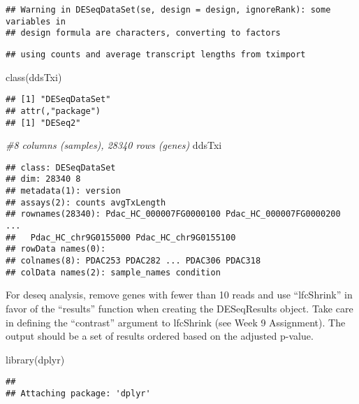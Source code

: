 \documentclass[
]{article}
\newenvironment{Shaded}{\begin{snugshade}}{\end{snugshade}}
\newcommand{\CommentTok}[1]{\textcolor[rgb]{0.56,0.35,0.01}{\textit{#1}}}
\newcommand{\FunctionTok}[1]{\textcolor[rgb]{0.00,0.00,0.00}{#1}}
\newcommand{\NormalTok}[1]{#1}
\begin{document}
\begin{verbatim}
## Warning in DESeqDataSet(se, design = design, ignoreRank): some variables in
## design formula are characters, converting to factors
\end{verbatim}

\begin{verbatim}
## using counts and average transcript lengths from tximport
\end{verbatim}

\begin{Shaded}
\begin{Highlighting}[]
\FunctionTok{class}\NormalTok{(ddsTxi)}
\end{Highlighting}
\end{Shaded}

\begin{verbatim}
## [1] "DESeqDataSet"
## attr(,"package")
## [1] "DESeq2"
\end{verbatim}

\begin{Shaded}
\begin{Highlighting}[]
\CommentTok{\#8 columns (samples), 28340 rows (genes)}
\NormalTok{ddsTxi}
\end{Highlighting}
\end{Shaded}

\begin{verbatim}
## class: DESeqDataSet 
## dim: 28340 8 
## metadata(1): version
## assays(2): counts avgTxLength
## rownames(28340): Pdac_HC_000007FG0000100 Pdac_HC_000007FG0000200 ...
##   Pdac_HC_chr9G0155000 Pdac_HC_chr9G0155100
## rowData names(0):
## colnames(8): PDAC253 PDAC282 ... PDAC306 PDAC318
## colData names(2): sample_names condition
\end{verbatim}

For deseq analysis, remove genes with fewer than 10 reads and use
``lfcShrink'' in favor of the ``results'' function when creating the
DESeqResults object. Take care in defining the ``contrast'' argument to
lfcShrink (see Week 9 Assignment). The output should be a set of results
ordered based on the adjusted p-value.

\begin{Shaded}
\begin{Highlighting}[]
\FunctionTok{library}\NormalTok{(dplyr)}
\end{Highlighting}
\end{Shaded}

\begin{verbatim}
## 
## Attaching package: 'dplyr'
\end{verbatim}
\end{document}

